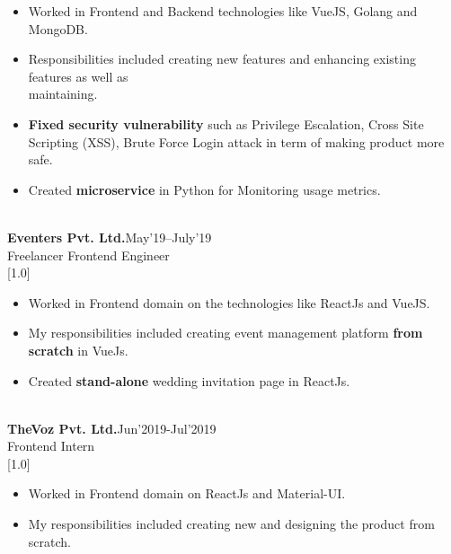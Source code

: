 \documentclass[english]{cv-style}     %
\begin{document}
\begin{entrylist}
{{\begin{itemize}
        \item Worked in Frontend and Backend technologies like VueJS, Golang and MongoDB.
        \item Responsibilities included creating new features and enhancing existing  features as well as \\ maintaining.
\item \textbf{Fixed security vulnerability} such as Privilege Escalation, Cross Site Scripting (XSS), Brute Force Login attack in term of making product more safe.
        \item Created \textbf{microservice} in Python for Monitoring usage metrics.
    \end{itemize}
  }}
  {
 	\textbf{}\\
 	 \vspace{-0.5cm}
  }
\textbf{Eventers Pvt. Ltd.}{\hfill \footnotesize{May'19--July'19}}\\
\footnotesize{Freelancer Frontend Engineer}
\vspace{0.1cm}\\
 \hspace{-0.2cm}
\entry
  {\scalebox{.8}[1.0]{}}
  {}
  {\footnotesize{
    \vspace{-0.5cm}
    \begin{itemize}
        \item Worked in Frontend domain on the technologies like ReactJs and VueJS.
        \item My responsibilities included creating event management platform \textbf{from scratch} in VueJs.
        \item Created \textbf{stand-alone} wedding invitation page in ReactJs.
    \end{itemize}
  }}
  {
 	\textbf{}\\
 	 \vspace{-0.5cm}
  }
\textbf{TheVoz Pvt. Ltd.}{\hfill \footnotesize{Jun’2019-Jul’2019}}\\
\footnotesize{Frontend Intern}
\vspace{0.1cm}\\
 \hspace{-0.2cm}
\entry
  {\scalebox{.8}[1.0]{}}
  {}
  {\footnotesize{
    \vspace{-0.5cm}
    \begin{itemize}
        \item Worked in Frontend domain on ReactJs and Material-UI.
        \item My responsibilities included creating new and designing the product from scratch.
    \end{itemize}
  }}
  {
 	\textbf{}\\
 	 \vspace{-0.5cm}
  }
\end{entrylist}
\end{document}
